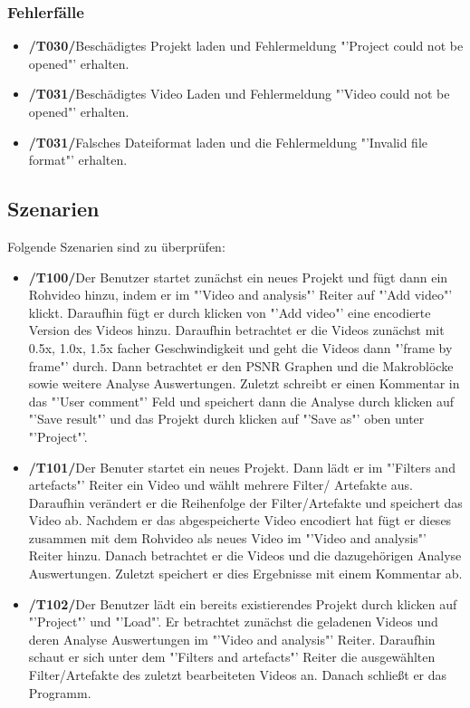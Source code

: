 \documentclass[parskip=full]{scrartcl}
\begin{document}
\subsubsection{Fehlerfälle}
\begin{itemize}
\item[]\textbf{/T030/}\qquad Beschädigtes Projekt laden und Fehlermeldung "'Project could not be opened"' erhalten.
\item[]\textbf{/T031/}\qquad Beschädigtes Video Laden und Fehlermeldung "'Video could not be opened"' erhalten.
\item[]\textbf{/T031/}\qquad Falsches Dateiformat laden und die Fehlermeldung "'Invalid file format"' erhalten.
\end{itemize}
\subsection{Szenarien}
Folgende Szenarien sind zu überprüfen:
\begin{itemize}
\item[]\textbf{/T100/}\qquad Der Benutzer startet zunächst ein neues Projekt und fügt dann ein Rohvideo hinzu, indem er im "'Video and analysis"' Reiter auf "'Add video"' klickt. Daraufhin fügt er durch klicken von "'Add video"' eine encodierte Version des Videos hinzu. Daraufhin betrachtet er die Videos zunächst mit 0.5x, 1.0x, 1.5x facher Geschwindigkeit und geht die Videos dann "'frame by frame"' durch. Dann betrachtet er den PSNR Graphen und die Makroblöcke sowie weitere Analyse Auswertungen. Zuletzt schreibt er einen Kommentar in das "'User comment"' Feld und speichert dann die Analyse durch klicken auf "'Save result"' und das Projekt durch klicken auf "'Save as"' oben unter "'Project"'.
\item[]\textbf{/T101/}\qquad Der Benuter startet ein neues Projekt. Dann lädt er im "'Filters and artefacts"' Reiter ein Video und wählt mehrere Filter/ Artefakte aus. Daraufhin verändert er die Reihenfolge der Filter/Artefakte und speichert das Video ab. Nachdem er das abgespeicherte Video encodiert hat fügt er dieses zusammen mit dem Rohvideo als neues Video im "'Video and analysis"' Reiter hinzu. Danach betrachtet er die Videos und die dazugehörigen Analyse Auswertungen. Zuletzt speichert er dies Ergebnisse mit einem Kommentar ab.
\item[]\textbf{/T102/}\qquad Der Benutzer lädt ein bereits existierendes Projekt durch klicken auf "'Project"' und "'Load"'. Er betrachtet zunächst die geladenen Videos und deren Analyse Auswertungen im "'Video and analysis"' Reiter. Daraufhin schaut er sich unter dem "'Filters and artefacts"' Reiter die ausgewählten Filter/Artefakte des zuletzt bearbeiteten Videos an. Danach schließt er das Programm.
\end{itemize}
\newpage
\end{document}
